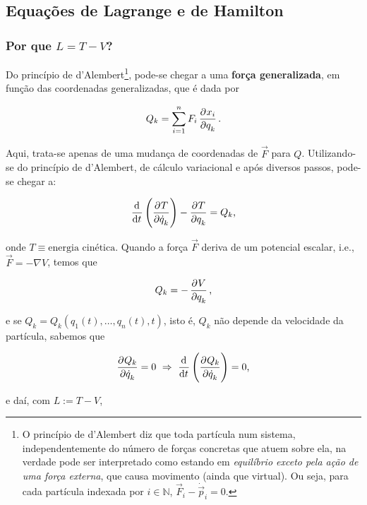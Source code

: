 \subsection{Equações de Lagrange e de Hamilton}
\label{ssec:lagrange_hamilton}

\subsubsection{Por que $L = T - V$?}
\label{sssec:lagrange_eq}

Do princípio de d'Alembert\footnote{O princípio de d'Alembert diz que toda
    partícula num sistema, independentemente do número de forças concretas que
    atuem sobre ela, na verdade pode ser interpretado como estando em
    \textit{equilíbrio exceto pela ação de uma força externa}, que causa
movimento (ainda que virtual).  Ou seja, para cada partícula indexada por $i \in
\mathbb{N}$, $\vec F_i - \dot{\vec p}_i = 0$.}, pode-se chegar a uma
\textbf{força generalizada}, em função das coordenadas generalizadas, que é dada
por

\begin{equation*}
    Q_k = \sum_{i=1}^n F_i \dpd{x_i}{q_k} \text{.}
\end{equation*}

Aqui, trata-se apenas de uma mudança de coordenadas de $\vec F$ para $Q$.
Utilizando-se do princípio de d'Alembert, de cálculo variacional e após diversos
passos, pode-se chegar a:

\begin{equation}
    \label{eq:lagrange_original}
    \dod{}{t} \del{\dpd{T}{\dot q_k}} - \dpd{T}{q_k} = Q_k \text{,}
\end{equation}

onde $T \equiv \text{energia cinética}$. Quando a força $\vec F$ deriva de um
potencial escalar, i.e., $\vec F = -\nabla V$, temos que

\begin{equation*}
    Q_k = - \dpd{V}{q_k} \text{,}
\end{equation*}

e se $Q_k = Q_k(q_1(t), \ldots, q_n(t), t)$, isto é, $Q_k$ não depende da
velocidade da partícula, sabemos que

\begin{equation*}
    \dpd{Q_k}{\dot q_k} = 0 ~\Rightarrow~ \dod{}{t} \del{\dpd{Q_k}{\dot q_k}} =
    0 \text{,}
\end{equation*}

e daí, com $L := T - V$,

